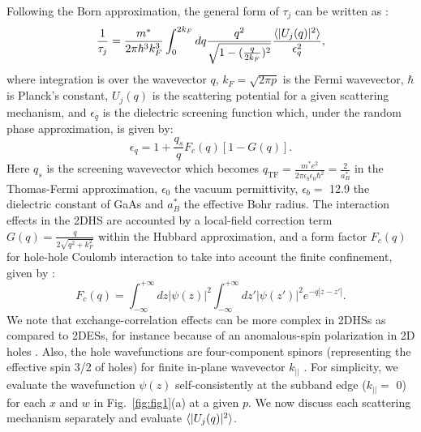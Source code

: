 \documentclass[reprint,amsmath,amssymb,aps,prl,nobibnotes,superscriptaddress]{revtex4-1}
\begin{document}
Following the Born approximation, the general form of $\tau_j$ can be written as \cite{Gold1989, Huang2022}:
\begin{equation}
\frac{1}{\tau_j} = \frac{m^*}{2\pi\hbar^3k_F^3}\int_0^{2k_F}dq\frac{q^2}{\sqrt{1-(\frac{q}{2k_F})^2}}\frac{\braket{|U_j(q)|^2}}{\epsilon_q^2},
\label{eq:tau}
\end{equation}  
where integration is over the wavevector $q$, $k_F=\sqrt{2\pi p}$ is the Fermi wavevector, $\hbar$ is Planck's constant, $U_j(q)$ is the scattering potential for a given scattering mechanism, and $\epsilon_q$ is the dielectric screening function which, under the random phase approximation, is given by:
\begin{equation}
\epsilon_q = 1 + \frac{q_s}{q}F_c(q)[1-G(q)].
\label{eq:epsilon}
\end{equation}  
Here $q_s$ is the screening wavevector which becomes $q_\textrm{TF}=\frac{m^*e^2}{2\pi\epsilon_b\epsilon_0\hbar^2}=\frac{2}{a^*_B}$ in the Thomas-Fermi approximation, $\epsilon_0$
the vacuum permittivity, $\epsilon_b=$ 12.9 the dielectric constant of GaAs and $a^*_B$ the effective Bohr radius. The interaction effects in the 2DHS are accounted by a local-field correction term $G(q)=\frac{q}{2\sqrt{q^2+k_F^2}}$ within the Hubbard approximation, and a form factor $F_c(q)$ for hole-hole Coulomb interaction to take into account the finite confinement, given by \cite{Gold1989, Huang2022}:
\begin{equation}
F_c(q)=\int_{-\infty}^{+\infty}dz|\psi(z)|^2\int_{-\infty}^{+\infty}dz'|\psi(z')|^2e^{-q|z-z'|}.
\label{eq:ff}
\end{equation}
We note that exchange-correlation effects can be more complex in 2DHSs as compared to 2DESs, for instance because of an anomalous-spin polarization in 2D holes \cite{Winkler2005}. Also, the hole wavefunctions are four-component spinors (representing the effective spin 3/2 of holes) for finite in-plane wavevector $k_{||}$ \cite{Winkler2003}. For simplicity, we evaluate the wavefunction $\psi(z)$  self-consistently at the subband edge ($k_{||}=$ 0) for each $x$ and $w$ in Fig.~\ref{fig:fig1}(a) at a given $p$. We now discuss each scattering mechanism separately and evaluate $\braket{|U_j(q)|^2}$.
\end{document}
